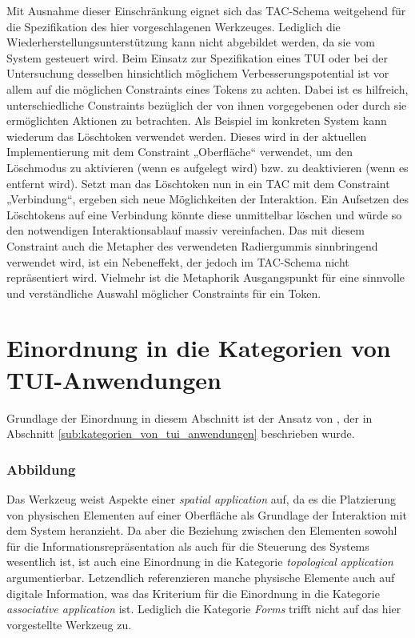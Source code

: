 Mit Ausnahme dieser Einschränkung eignet sich das \gls{TAC}-Schema weitgehend für die Spezifikation des hier vorgeschlagenen Werkzeuges. Lediglich die Wiederherstellungsunterstützung kann nicht abgebildet werden, da sie vom System gesteuert wird. Beim Einsatz zur Spezifikation eines \gls{TUI} oder bei der Untersuchung desselben hinsichtlich möglichem Verbesserungspotential ist vor allem auf die möglichen Constraints eines Tokens zu achten. Dabei ist es hilfreich, unterschiedliche Constraints bezüglich der von ihnen vorgegebenen oder durch sie ermöglichten Aktionen zu betrachten. Als Beispiel im konkreten System kann wiederum das Löschtoken verwendet werden. Dieses wird in der aktuellen Implementierung mit dem Constraint „Oberfläche“ verwendet, um den Löschmodus zu aktivieren (wenn es aufgelegt wird) bzw. zu deaktivieren (wenn es entfernt wird). Setzt man das Löschtoken nun in ein \gls{TAC} mit dem Constraint „Verbindung“, ergeben sich neue Möglichkeiten der Interaktion. Ein Aufsetzen des Löschtokens auf eine Verbindung könnte diese unmittelbar löschen und würde so den notwendigen Interaktionsablauf massiv vereinfachen. Das mit diesem Constraint auch die Metapher des verwendeten Radiergummis sinnbringend verwendet wird, ist ein Nebeneffekt, der jedoch im \gls{TAC}-Schema nicht repräsentiert wird. Vielmehr ist die Metaphorik Ausgangspunkt für eine sinnvolle und verständliche Auswahl möglicher Constraints für ein Token.


\section{Einordnung in die Kategorien von TUI-Anwendungen} %
\label{sec:einordnung_in_die_kategorien_von_tui_anwendungen}

Grundlage der Einordnung in diesem Abschnitt ist der Ansatz von \citet{Klemmer04}, der in Abschnitt \ref{sub:kategorien_von_tui_anwendungen} beschrieben wurde.

\subsubsection{Abbildung}

Das Werkzeug weist Aspekte einer \emph{spatial application} auf, da es die Platzierung von physischen Elementen auf einer Oberfläche als Grundlage der Interaktion mit dem System heranzieht. Da aber die Beziehung zwischen den Elementen sowohl für die Informationsrepräsentation als auch für die Steuerung des Systems wesentlich ist, ist auch eine Einordnung in die Kategorie \emph{topological application} argumentierbar. Letzendlich referenzieren manche physische Elemente auch auf digitale Information, was das Kriterium für die Einordnung in die Kategorie \emph{associative application} ist. Lediglich die Kategorie \emph{Forms} trifft nicht auf das hier vorgestellte Werkzeug zu. 

